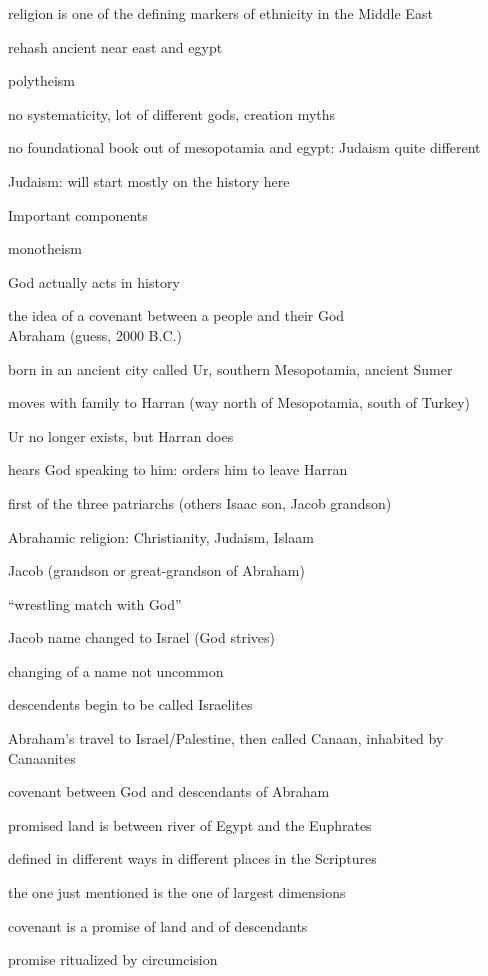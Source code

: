 \documentclass[12pt]{article}
\begin{document}
\noindent
religion is one of the defining markers of ethnicity in the Middle East

\noindent
rehash ancient near east and egypt

polytheism

no systematicity, lot of different gods, creation myths

no foundational book out of mesopotamia and egypt: Judaism quite different

\noindent
Judaism: will start mostly on the history here

\noindent
Important components

monotheism

God actually acts in history

the idea of a covenant between a people and their God\\

\noindent
Abraham (guess, 2000 B.C.)

born in an ancient city called Ur, southern Mesopotamia, ancient Sumer

moves with family to Harran (way north of Mesopotamia, south of Turkey)

Ur no longer exists, but Harran does

hears God speaking to him: orders him to leave Harran

first of the three patriarchs (others Isaac son, Jacob grandson)

Abrahamic religion: Christianity, Judaism, Islaam

\noindent
Jacob (grandson or great-grandson of Abraham)

``wrestling match with God''

Jacob name changed to Israel (God strives)

changing of a name not uncommon

descendents begin to be called Israelites

\noindent
Abraham's travel to Israel/Palestine, then called Canaan, inhabited by Canaanites

covenant between God and descendants of Abraham

promised land is between river of Egypt and the Euphrates

defined in different ways in different places in the Scriptures

the one just mentioned is the one of largest dimensions

covenant is a promise of land and of descendants

\noindent
promise ritualized by circumcision
\end{document}
